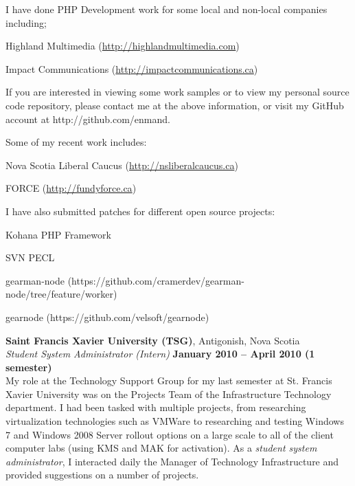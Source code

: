 \documentclass[margin,line]{resume}
\begin{document}
\begin{resume}
	I have done PHP Development work for some local and non-local companies including;
	\begin{list2}
		\item Highland Multimedia (\href{http://highlandmultimedia.com}{http://highlandmultimedia.com})
		\item Impact Communications (\href{impactcommunications.ca/}{http://impactcommunications.ca})
	\end{list2}

	If you are interested in viewing some work samples or to view my personal source code repository, please contact me at the above information, or visit my GitHub account at http://github.com/enmand.

	 Some of my recent work includes:
	\begin{list2}
		\item Nova Scotia Liberal Caucus (\href{http://nsliberalcaucus.ca}{http://nsliberalcaucus.ca})
		\item FORCE (\href{http://fundyforce.ca}{http://fundyforce.ca})
	\end{list2}

	I have also submitted patches for different open source projects:
	\begin{list2}
		\item Kohana PHP Framework
		\item SVN PECL
		\item gearman-node (https://github.com/cramerdev/gearman-node/tree/feature/worker)
		\item gearnode (https://github.com/velsoft/gearnode)
	\end{list2}

	{\bf Saint Francis Xavier University (TSG)}, Antigonish, Nova Scotia \vspace{2mm}\\\vspace{1mm}%
	{\sl Student System Administrator (Intern)} \hfill {\bf January 2010 -- April 2010 (1 semester)}\\
	My role at the Technology Support Group for my last semester at St. Francis Xavier University was on the Projects Team of the Infrastructure Technology department. I had been tasked with multiple projects, from researching virtualization technologies such as VMWare to researching and testing Windows 7 and Windows 2008 Server rollout options on a large scale to all of the client computer labs (using KMS and MAK for activation). As a \textit{student system administrator}, I interacted daily the Manager of Technology Infrastructure and provided suggestions on a number of projects.


\end{resume}
\end{document}

